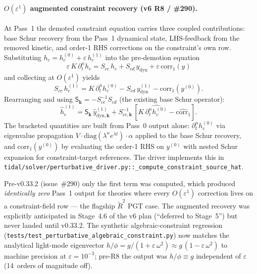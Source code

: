 \paragraph{$O(\varepsilon^1)$ augmented constraint recovery (v6 R8 / \#290).} At Pass~1 the demoted constraint equation carries three coupled contributions: base Schur recovery from the Pass~1 dynamical state, LHS-feedback from the removed kinetic, and order-1 RHS corrections on the constraint's own row. Substituting $h_c = h_c^{(0)} + \varepsilon\, h_c^{(1)}$ into the pre-demotion equation
\begin{equation}
  \varepsilon\, K\, \partial_t^n h_c = S_{cc}\, h_c + S_{cd}\, y_{\mathrm{dyn}} + \varepsilon\, \mathrm{corr}_1(y)
\end{equation}
and collecting at $O(\varepsilon^1)$ yields
\begin{equation}
  S_{cc}\, h_c^{(1)} = K\, \partial_t^n h_c^{(0)} - S_{cd}\, y_{\mathrm{dyn}}^{(1)} - \mathrm{corr}_1(y^{(0)}).
\end{equation}
Rearranging and using $\mathsf{S}_\mathbf{k} = -S_{cc}^{-1} S_{cd}$ (the existing base Schur operator):
\begin{equation}
  \boxed{\;\hat{h}_c^{(1)} = \mathsf{S}_\mathbf{k}\, \hat{y}_{\mathrm{dyn},\mathbf{k}}^{(1)} + S_{cc,\mathbf{k}}^{-1}\, \left[K\, \widehat{\partial_t^n h_c^{(0)}} - \widehat{\mathrm{corr}_1}\right].\;}
\end{equation}
The bracketed quantities are built from Pass~0 output alone: $\partial_t^n h_c^{(0)}$ via eigenvalue propagation $V \cdot \mathrm{diag}(\lambda^n e^{\lambda t}) \cdot \alpha$ applied to the base Schur recovery, and $\mathrm{corr}_1(y^{(0)})$ by evaluating the order-1 RHS on $y^{(0)}$ with nested Schur expansion for constraint-target references. The driver implements this in \texttt{tidal/solver/perturbative\_driver.py::\_compute\_constraint\_source\_hat}.

Pre-v0.33.2 (issue~\#290) only the first term was computed, which produced \emph{identically zero} Pass~1 output for theories where every $O(\varepsilon^1)$ correction lives on a constraint-field row --- the flagship $\tilde{R}^2$ PGT case. The augmented recovery was explicitly anticipated in Stage~4.6 of the v6 plan (``deferred to Stage~5'') but never landed until v0.33.2. The synthetic algebraic-constraint regression (\verb|tests/test_perturbative_algebraic_constraint.py|) now matches the analytical light-mode eigenvector $h/\phi = g/(1 + \varepsilon\, \omega^2) \approx g\,(1 - \varepsilon\, \omega^2)$ to machine precision at $\varepsilon = 10^{-3}$; pre-R8 the output was $h/\phi \equiv g$ independent of $\varepsilon$ (14~orders of magnitude off).

